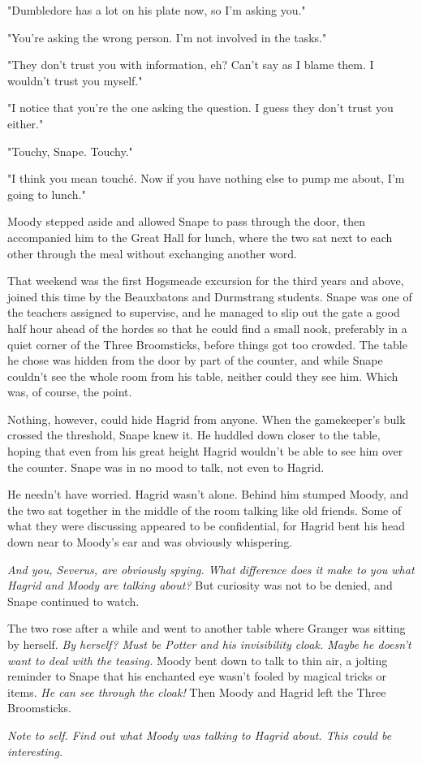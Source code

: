 "Dumbledore has a lot on his plate now, so I'm asking you."

"You're asking the wrong person. I'm not involved in the tasks."

"They don't trust you with information, eh? Can't say as I blame them. I wouldn't trust you myself."

"I notice that you're the one asking the question. I guess they don't trust you either."

"Touchy, Snape. Touchy."

"I think you mean touché. Now if you have nothing else to pump me about, I'm going to lunch."

Moody stepped aside and allowed Snape to pass through the door, then accompanied him to the Great Hall for lunch, where the two sat next to each other through the meal without exchanging another word.

That weekend was the first Hogsmeade excursion for the third years and above, joined this time by the Beauxbatons and Durmstrang students. Snape was one of the teachers assigned to supervise, and he managed to slip out the gate a good half hour ahead of the hordes so that he could find a small nook, preferably in a quiet corner of the Three Broomsticks, before things got too crowded. The table he chose was hidden from the door by part of the counter, and while Snape couldn't see the whole room from his table, neither could they see him. Which was, of course, the point.

Nothing, however, could hide Hagrid from anyone. When the gamekeeper's bulk crossed the threshold, Snape knew it. He huddled down closer to the table, hoping that even from his great height Hagrid wouldn't be able to see him over the counter. Snape was in no mood to talk, not even to Hagrid.

He needn't have worried. Hagrid wasn't alone. Behind him stumped Moody, and the two sat together in the middle of the room talking like old friends. Some of what they were discussing appeared to be confidential, for Hagrid bent his head down near to Moody's ear and was obviously whispering.

\emph{And you, Severus, are obviously spying. What difference does it make to you what Hagrid and Moody are talking about?} But curiosity was not to be denied, and Snape continued to watch.

The two rose after a while and went to another table where Granger was sitting by herself. \emph{By herself? Must be Potter and his invisibility cloak. Maybe he doesn't want to deal with the teasing.} Moody bent down to talk to thin air, a jolting reminder to Snape that his enchanted eye wasn't fooled by magical tricks or items. \emph{He can see through the cloak!} Then Moody and Hagrid left the Three Broomsticks.

\emph{Note to self. Find out what Moody was talking to Hagrid about. This could be interesting.}

\sbreak 


